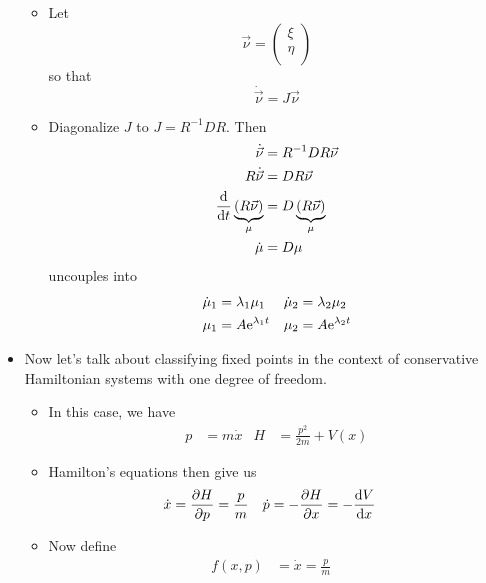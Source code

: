 \documentclass[../notes.tex]{subfiles}
\begin{document}
\begin{itemize}
\begin{itemize}
        \item Let
        \begin{equation*}
            \vec{\nu} =
            \begin{pmatrix}
                \xi\\
                \eta\\
            \end{pmatrix}
        \end{equation*}
        so that
        \begin{equation*}
            \dot{\vec{\nu}} = J\vec{\nu}
        \end{equation*}
        \item Diagonalize $J$ to $J=R^{-1}DR$. Then
        \begin{align*}
            \dot{\vec{\nu}} &= R^{-1}DR\vec{\nu}\\
            R\dot{\vec{\nu}} &= DR\vec{\nu}\\
            \dv{t}\underbrace{(R\vec{\nu})}_\mu &= D\underbrace{(R\vec{\nu})}_\mu\\
            \dot{\mu} &= D\mu
        \end{align*}
        uncouples into
        \begin{align*}
            \dot{\mu}_1 &= \lambda_1\mu_1&
                \dot{\mu}_2 &= \lambda_2\mu_2\\
            \mu_1 &= A\e[\lambda_1t]&
                \mu_2 &= A\e[\lambda_2t]
        \end{align*}
    \end{itemize}
    \item Now let's talk about classifying fixed points in the context of conservative Hamiltonian systems with one degree of freedom.
    \begin{itemize}
        \item In this case, we have 
        \begin{align*}
            p &= m\dot{x}&
            H &= \frac{p^2}{2m}+V(x)
        \end{align*}
        \item Hamilton's equations then give us
        \begin{align*}
            \dot{x} &= \pdv{H}{p} = \frac{p}{m}&
            \dot{p} &= -\pdv{H}{x} = -\dv{V}{x}
        \end{align*}
        \item Now define
        \begin{align*}
            f(x,p) &= \dot{x} = \frac{p}{m}&

\end{align*}
\end{itemize}
\end{itemize}
\end{document}
